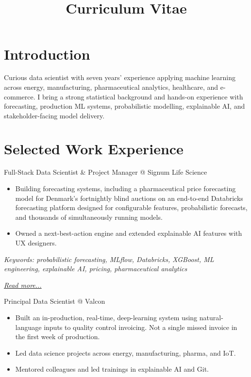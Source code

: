 \documentclass[11pt,a4paper]{moderncv}
\title{Curriculum Vitae}
\begin{document}
\makecvtitle

\section*{Introduction}
Curious data scientist with seven years' experience applying machine learning across energy, manufacturing, pharmaceutical analytics, healthcare, and e-commerce. I bring a strong statistical background and hands-on experience with forecasting, production ML systems, probabilistic modelling, explainable AI, and stakeholder-facing model delivery.

\section{Selected Work Experience}

\large{Full-Stack Data Scientist \& Project Manager @ Signum Life Science}
\normalsize
\begin{itemize}
    \item Building forecasting systems, including a pharmaceutical price forecasting model for Denmark's fortnightly blind auctions on an end-to-end Databricks forecasting platform designed for configurable features, probabilistic forecasts, and thousands of simultaneously running models.
    \item Owned a next-best-action engine and extended explainable AI features with UX designers.
\end{itemize}

{\footnotesize\textit{Keywords: probabilistic forecasting, MLflow, Databricks, XGBoost, ML engineering, explainable AI, pricing, pharmaceutical analytics}}

\hfill{\small{\textit{\hyperref[sec:signum]{Read more...}}}}

\large{Principal Data Scientist @ Valcon}
\normalsize
\begin{itemize}
    \item Built an in-production, real-time, deep-learning system using natural-language inputs to quality control invoicing. Not a single missed invoice in the first week of production.
    \item Led data science projects across energy, manufacturing, pharma, and IoT.
    \item Mentored colleagues and led trainings in explainable AI and Git.
\end{itemize}
\end{document}
